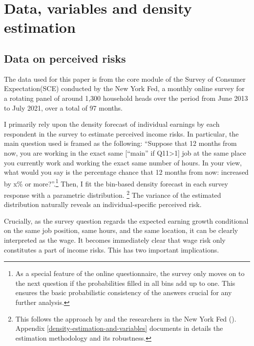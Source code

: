 
    \hypertarget{data-variables-and-density-estimation}{%
\section{Data, variables and density
estimation}\label{data-variables-and-density-estimation}}

\hypertarget{data}{%
\subsection{Data on perceived risks}\label{data}}

The data used for this paper is from the core module of the Survey of Consumer Expectation(SCE) conducted by the New York Fed, a monthly online survey for a rotating panel of around 1,300 household heads over the period from June 2013 to July 2021, over a total of 97 months.


I primarily rely upon the density forecast of individual earnings by each respondent in the survey to estimate perceived income risks. In particular, the main question used is
framed as the following: ``Suppose that 12 months from now, you are working in the
exact same {[}``main'' if Q11\textgreater1{]} job at the same place you currently work and working the exact same number of hours. In your view, what would you say is the percentage chance that 12 months from now: increased by x\% or more?''.\footnote{As a special feature of the online questionnaire, the survey only moves on to the next question if the probabilities filled in all bins add up to one. This ensures the basic probabilistic consistency of the answers
crucial for any further analysis.} Then, I fit the bin-based density forecast in each survey response with a parametric distribution. \footnote{This follows the approach by \cite{engelberg_comparing_2009} and the researchers in the New York Fed (\cite{armantier_overview_2017}). Appendix \ref{density-estimation-and-variables} documents in details the estimation methodology and its robustness.} The variance of the estimated distribution naturally reveals an individual-specific perceived risk.

Crucially, as the survey question regards the expected earning growth conditional on the same job position, same hours, and the same location, it can be clearly interpreted as the wage. It becomes immediately clear that wage risk only constitutes a part of income risks. This has two important implications. 

